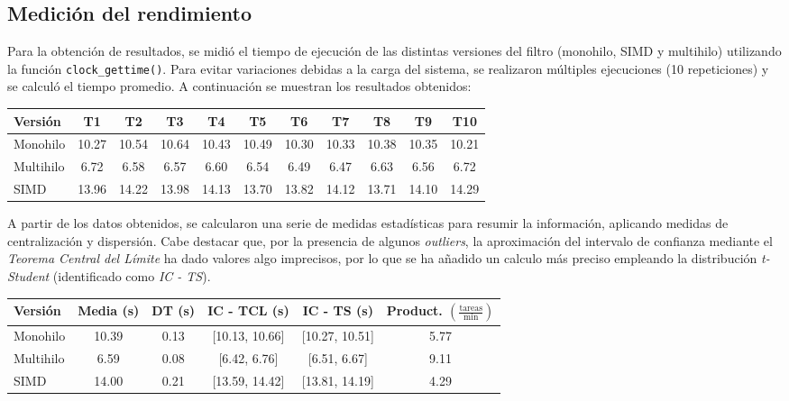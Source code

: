 \documentclass[11pt,a4paper]{article}
\begin{document}
\subsection{Medición del rendimiento}
Para la obtención de resultados, se midió el tiempo de ejecución de las distintas versiones del filtro (monohilo, SIMD y multihilo) utilizando la función \texttt{clock\_gettime()}. Para evitar variaciones debidas a la carga del sistema, se realizaron múltiples ejecuciones (10 repeticiones) y se calculó el tiempo promedio. A continuación se muestran los resultados obtenidos:
\begin{center}
    \begin{tabular}{l|cccccccccc}
        \textbf{Versión} & T1 & T2 & T3 & T4 & T5 & T6 & T7 & T8 & T9 & T10 \\
        \hline \hline
        Monohilo & 10.27 & 10.54 & 10.64 & 10.43 & 10.49 & 10.30 & 10.33 & 10.38 & 10.35 & 10.21\\[1ex]
        Multihilo & 6.72 & 6.58 & 6.57 & 6.60 & 6.54 & 6.49 & 6.47 & 6.63 & 6.56 & 6.72 \\[1ex]
        SIMD & 13.96 & 14.22 & 13.98 & 14.13 & 13.70 & 13.82 & 14.12 & 13.71 & 14.10 & 14.29
    \end{tabular}
\end{center}
\vspace{1ex}

\noindent A partir de los datos obtenidos, se calcularon una serie de medidas estadísticas para resumir la información, aplicando medidas de centralización y dispersión. Cabe destacar que, por la presencia de algunos \textit{outliers}, la aproximación del intervalo de confianza mediante el \textit{Teorema Central del Límite} ha dado valores algo imprecisos, por lo que se ha añadido un calculo más preciso empleando la distribución \textit{t-Student} (identificado como \textit{IC - TS}).\vspace{2ex}
\begin{center}
    \begin{tabular}{l|ccccc}
        \textbf{Versión} & Media (s) & DT (s) & IC - TCL (s) & IC - TS (s) & Product. \(\left(\frac{\text{tareas}}{\text{min}}\right)\)\\ 
        \hline \hline
        Monohilo & 10.39 & 0.13 & [10.13, 10.66] & [10.27, 10.51] & 5.77 \\[1ex]
        Multihilo & 6.59 & 0.08 & [6.42, 6.76] & [6.51, 6.67] & 9.11 \\[1ex]
        SIMD & 14.00 & 0.21 & [13.59, 14.42] & [13.81, 14.19] & 4.29
    \end{tabular}
\end{center}
\vspace{2ex}
\end{document}
